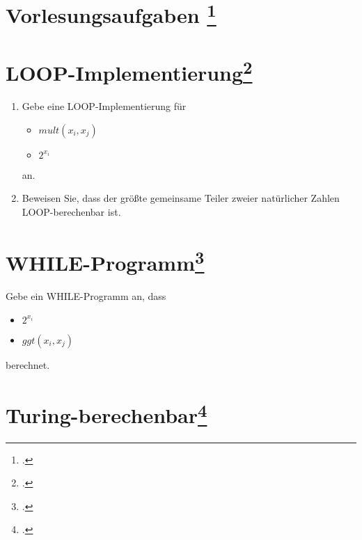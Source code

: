 \documentclass{lehramt-informatik-aufgabe}
\begin{document}
\section{Vorlesungsaufgaben
\footcite{theo:fs:4}}

%

\section{LOOP-Implementierung\footcite[Seite 11]{theo:fs:4}}

\begin{enumerate}
\item Gebe eine LOOP-Implementierung für

\begin{itemize}
\item $mult(x_i, x_j)$
\item $2^{x_i}$
\end{itemize}

an.

\item Beweisen Sie, dass der größte gemeinsame Teiler zweier natürlicher
Zahlen LOOP-berechenbar ist.

\end{enumerate}

%

\section{WHILE-Programm\footcite[Seite 16]{theo:fs:4}}

Gebe ein WHILE-Programm an, dass

\begin{itemize}
\item $2^{x_i}$
\item $ggt(x_i, x_j)$
\end{itemize}

berechnet.

%

\section{Turing-berechenbar\footcite[Seite 29]{theo:fs:4}}
\end{document}
